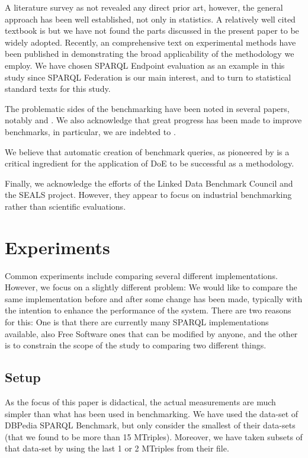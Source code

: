 \documentclass{article}
\begin{document}
A literature survey as not revealed any direct prior art, however, the
general approach has been well established, not only in statistics. A
relatively well cited textbook is \cite{citeulike:5190414} but we have
not found the parts discussed in the present paper to be widely
adopted. Recently, an comprehensive text on experimental methods have
been published in
\cite{Springer-2010-Experimental-Methods-for-the-Analysis-of-Optimization-Algorithms}
demonstrating the broad applicability of the methodology we employ.
We have chosen SPARQL Endpoint evaluation as an example in this study
since SPARQL Federation is our main interest, and to turn to
statistical standard texts \cite{wu2009experiments} for this study.

The problematic sides of the benchmarking have been noted in several
papers, notably \cite{Duan:2011:AOC:1989323.1989340} and
\cite{MontoyaVCRA12}. We also acknowledge that great
progress has been made to improve benchmarks, in particular, we are
indebted to \cite{mxro:Morsey2011DBpedia}. 

We believe that automatic creation of benchmark queries, as
pioneered by \cite{goerlitz2012splodge} is a critical ingredient for
the application of DoE to be successful as a methodology.

Finally, we acknowledge the efforts of the Linked Data Benchmark
Council and the SEALS project. However, they appear to focus on
industrial benchmarking rather than scientific evaluations. 

\section{Experiments}

Common experiments include comparing several different
implementations. However, we focus on a slightly different problem: We
would like to compare the same implementation before and after some
change has been made, typically with the intention to enhance the
performance of the system. There are two reasons for this: One is that
there are currently many SPARQL implementations available, also Free
Software ones that can be modified by anyone, and the other is to
constrain the scope of the study to comparing two different things.

\subsection{Setup}

As the focus of this paper is didactical, the actual measurements are
much simpler than what has been used in benchmarking. We have used the
data-set of DBPedia SPARQL Benchmark\cite{mxro:Morsey2011DBpedia}, but only consider the
smallest of their data-sets (that we found to be more than 15
MTriples). Moreover, we have taken subsets of that data-set by using
the last 1 or 2 MTriples from their file.
\end{document}
